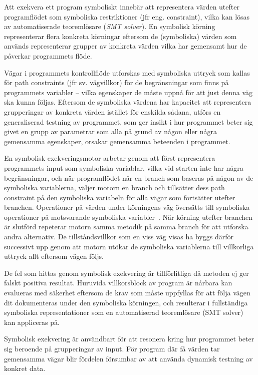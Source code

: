 Att exekvera ett program symboliskt innebär att representera värden utefter 
programflödet som symboliska restriktioner (jfr eng. constraint), vilka kan lösas av automatiserade 
teoremlösare (\emph{SMT solver}). En symbolisk körning representerar flera konkreta 
körningar eftersom de (symboliska) värden som används representerar grupper av 
konkreta värden vilka har gemensamt hur de påverkar programmets flöde. 

Vägar i programmets kontrollflöde utforskas med symboliska uttryck som kallas
för path constraints (jfr sv. vägvillkor) för de begränsningar som finns på
programmets variabler -- vilka egenskaper de måste uppnå för att just denna väg
ska kunna följas. Eftersom de symboliska värdena har kapacitet att representera
grupperingar av konkreta värden istället för enskilda sådana, utförs en
generaliserad testning av programmet, som ger insikt i hur programmet beter sig
givet en grupp av parametrar som alla på grund av någon eller några gemensamma
egenskaper, orsakar gemensamma beteenden i programmet. 

En symbolisk exekveringsmotor arbetar genom att först representera programmets
input som symboliska variablar, vilka vid starten inte har några begränsningar,
och när programflödet når en branch som baseras på någon av de symboliska
variablerna, väljer motorn en branch och tillsätter dess path constraint på den
symboliska variabeln för alla vägar som fortsätter utefter branchen. Operationer
på värden under körningens väg översätts till symboliska operationer på
motsvarande symboliska variabler~\cite{klee}. När körning utefter branchen är
slutförd repeterar motorn samma metodik på samma branch för att utforska andra
alternativ. De tillståndsvillkor som en viss väg visas ha byggs därför
successivt upp genom att motorn utökar de symboliska variablerna till
villkorliga uttryck allt eftersom vägen följs. 

De fel som hittas genom symbolisk exekvering är tillförlitliga då metoden ej ger falskt 
positiva resultat. Huruvida villkorsblock av program är nårbara kan evalueras med 
säkerhet eftersom de krav som måste uppfyllas för att följa vägen dit dokumenteras under 
den symboliska körningen, och resulterar i fullständiga symboliska representationer 
som en automatiserad teoremlösare (SMT solver) kan appliceras på. 

Symbolisk exekvering är användbart för att resonera kring hur programmet beter sig 
beroende på grupperingar av input. För program där få värden tar gemensamma vägar blir 
fördelen försumbar av att använda dynamisk testning av konkret data. 

